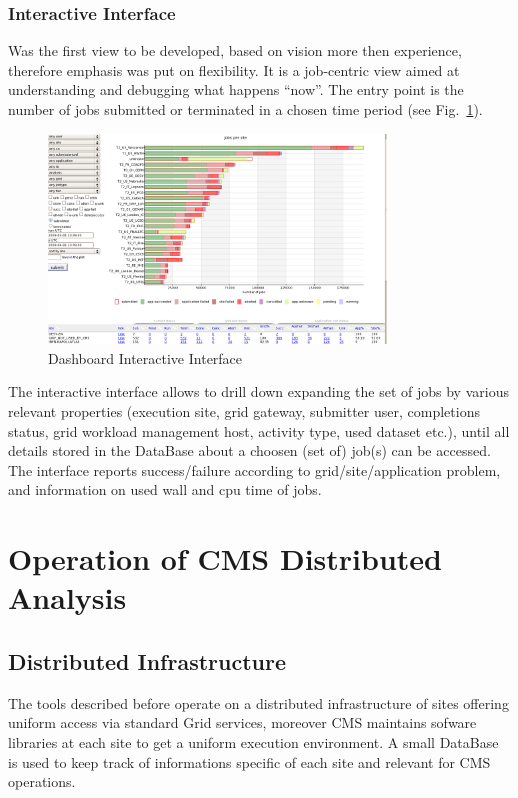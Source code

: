 \subsubsection{Interactive Interface}
Was the first view to be developed, based on
vision more then experience, therefore
emphasis was put on flexibility. It is a job-centric view
aimed at understanding and debugging what happens ``now''.
The entry point is the number of jobs submitted or
terminated in a chosen time period (see Fig.~\ref{fig:Dashboard}).
\begin{figure}
 \includegraphics[width=0.80\textwidth]{figures/DashboardInteractive.png}
\caption{Dashboard Interactive Interface}
\label{fig:Dashboard}
\end{figure}
The interactive interface allows to drill down expanding the set of jobs by
various relevant properties (execution site, grid gateway,
submitter user, completions status, grid workload management host,
activity type, used dataset etc.), until all details stored in the DataBase
about a choosen (set of) job(s) can be accessed.
The interface reports success/failure
according to grid/site/application problem, and information
on used wall and cpu time of jobs.

\section{Operation of CMS Distributed Analysis}
\label{sec:4}
\subsection{Distributed Infrastructure}
\label{sec:4_1}
The tools described before operate on a distributed infrastructure
of sites offering uniform access via standard Grid services, moreover CMS maintains
sofware libraries at each site to get a uniform execution
environment. A small DataBase is used to keep track of
informations specific of each site and relevant for CMS operations.

